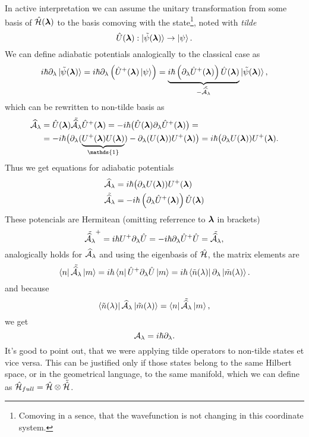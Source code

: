In active interpretation we can assume the unitary transformation from some basis of $\HH(\llambda)$ to the basis comoving with the state\footnote{Comoving in a sence, that the wavefunction is not changing in this coordinate system.}, noted with \emph{tilde}
\begin{equation}
    \U(\llambda): \ket{\tilde\psi(\llambda)} \rightarrow \kpsi.
    \label{eq:transformationU}
\end{equation}
We can define adiabatic potentials analogically to the classical case as
\begin{equation}
    i\hbar\partial_\lambda \ket{\tilde{\psi}(\llambda)} = i\hbar \partial_\lambda\left(\U^+(\llambda)\ket{\psi} \right)= \underbrace{i\hbar\left(\partial_\lambda \U^+(\llambda)\right)\U(\llambda)}_{-\tilde{\AA_\lambda}}\ket{\tilde{\psi}(\llambda)},
\end{equation}
which can be rewritten to non-tilde basis as
\begin{equation}
    \begin{split}
        \AA_\lambda&=\U(\llambda)\tilde{\AA_\lambda}\U^+(\llambda) = -i\hbar\big(\U(\llambda)\partial_\lambda \U^+(\llambda)\big) =\\
        &= -i\hbar\big(\partial_\lambda(\underbrace{U^+(\llambda)U(\llambda)}_{\mathds{1}})-\partial_\lambda(U(\llambda))U^+(\llambda) \big) =i\hbar \big(\partial_\lambda U(\llambda))U^+(\llambda).
    \end{split}
\end{equation}
Thus we get equations for adiabatic potentials
\begin{align}
    \AA_\lambda&=i\hbar \big(\partial_\lambda U(\llambda))U^+(\llambda)
    \label{eq:adiabaticPotential}\\
    \tilde{\AA_\lambda} &= -i\hbar\left(\partial_\lambda \U^+(\llambda)\right)\U(\llambda)
    \label{eq:adiabaticPotentialTilde}
\end{align}
These potencials are Hermitean (omitting referrence to $\llambda$ in brackets)
\begin{equation}
     \tilde{\AA_\lambda}^+=i\hbar U^+\partial_\lambda\U=-i\hbar\partial_\lambda\U^+\U = \tilde{\AA_\lambda} ,
\end{equation}
analogically holds for $\AA_\lambda$ and using the eigenbasis of $\HH$, the matrix elements are
\begin{equation}
    \bra{n}\tilde{\AA_\lambda}\ket{m}=i\hbar\bra{n}\U^+\partial_\lambda\U\ket{m} = i\hbar\bra{\tilde n(\lambda)}\partial_\lambda\ket{\tilde m(\lambda)}.
\end{equation}
and because
\begin{equation}
    \bra{\tilde n(\lambda)}\AA_\lambda\ket{\tilde m(\lambda)}= \bra{n}\tilde{\AA_\lambda}\ket{m},
\end{equation}
we get
\begin{equation}
    \A_\lambda = i\hbar\partial_\lambda.
    \label{eq:adiabaticPotentialDefinition}
\end{equation}
It's good to point out, that we were applying tilde operators to non-tilde states et vice versa. This can be justified only if those states belong to the same Hilbert space, or in the geometrical language, to the same manifold, which we can define as $\HH_{full}=\HH\otimes\tilde\HH$.


